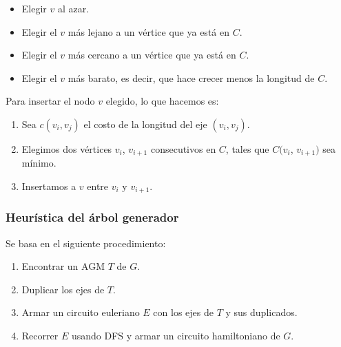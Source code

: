 \begin{itemize}
\item Elegir $v$ al azar.
\item Elegir el $v$ m\'as lejano a un v\'ertice que ya est\'a en $C$.
\item Elegir el $v$ m\'as cercano a un v\'ertice que ya est\'a en $C$.
\item Elegir el $v$ m\'as barato, es decir, que hace crecer menos la longitud de $C$.
\end{itemize}

Para insertar el nodo $v$ elegido, lo que hacemos es:

\begin{enumerate}
\item Sea $c(v_i,v_j)$ el costo de la longitud del eje $(v_i,v_j)$.
\item Elegimos dos v\'ertices $v_i$, $v_{i+1}$ consecutivos en $C$, tales que $C(v_i$, $v_{i+1})$ sea m\'inimo.
\item Insertamos a $v$ entre $v_i$ y $v_{i+1}$.
\end{enumerate}

\subsubsection*{Heur\'istica del \'arbol generador}

Se basa en el siguiente procedimiento:

\begin{enumerate}
\item Encontrar un AGM $T$ de $G$.
\item Duplicar los ejes de $T$.
\item Armar un circuito euleriano $E$ con los ejes de $T$ y sus duplicados.
\item Recorrer $E$ usando DFS y armar un circuito hamiltoniano de $G$.
\end{enumerate}